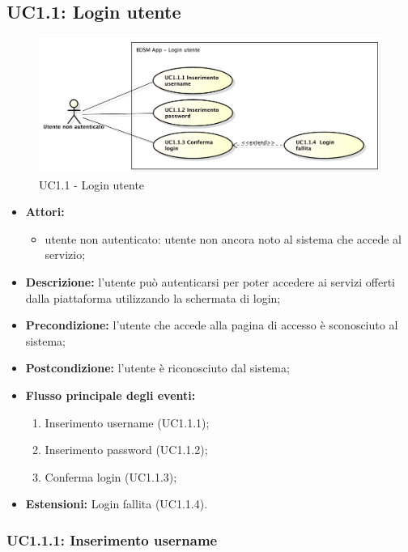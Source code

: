 \pagebreak

\subsection{UC1.1: Login utente}

\begin{figure}[htbp]
	\centering
	\centerline{\includegraphics[scale=0.45]{./images/UC1_1.pdf}}
	\caption{UC1.1 - Login utente}
\end{figure}

\begin{itemize}
	\item \textbf{Attori:}
	\begin{itemize}
		\item utente non autenticato: utente non ancora noto al sistema che accede al servizio;
	\end{itemize}
	\item \textbf{Descrizione:} l'utente può autenticarsi per poter accedere ai servizi offerti dalla piattaforma utilizzando la schermata di login;
	\item \textbf{Precondizione:} l'utente che accede alla pagina di accesso è sconosciuto al sistema;
	\item \textbf{Postcondizione:} l'utente è riconosciuto dal sistema;
	\item \textbf{Flusso principale degli eventi:}
	\begin{enumerate}
		\item Inserimento username (UC1.1.1);
		\item Inserimento password (UC1.1.2);
		\item Conferma login (UC1.1.3);
	\end{enumerate}
	\item \textbf{Estensioni:} Login fallita (UC1.1.4).
\end{itemize}


\subsubsection{UC1.1.1: Inserimento username}


